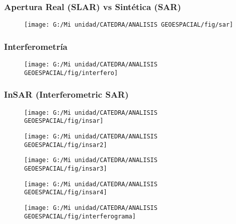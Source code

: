 \documentclass[14pt]{beamer}
\begin{document}
\begin{frame}
\frametitle{Apertura Real (SLAR) vs Sintética (SAR)
}
 \begin{figure}
    \centering
    \texttt{[image: G:/Mi unidad/CATEDRA/ANALISIS GEOESPACIAL/fig/sar]}
  \end{figure}
\end{frame}
\begin{frame}
\frametitle{Interferometría}
 \begin{figure}
    \centering
    \texttt{[image: G:/Mi unidad/CATEDRA/ANALISIS GEOESPACIAL/fig/interfero]}
  \end{figure}
\end{frame}
\begin{frame}
\frametitle{InSAR (Interferometric SAR)
}
 \begin{figure}
    \centering
    \texttt{[image: G:/Mi unidad/CATEDRA/ANALISIS GEOESPACIAL/fig/insar]}
  \end{figure}
\end{frame}
\begin{frame}
 \begin{figure}
    \centering
    \texttt{[image: G:/Mi unidad/CATEDRA/ANALISIS GEOESPACIAL/fig/insar2]}
  \end{figure}
\end{frame}
\begin{frame}
 \begin{figure}
    \centering
    \texttt{[image: G:/Mi unidad/CATEDRA/ANALISIS GEOESPACIAL/fig/insar3]}
  \end{figure}
\end{frame}
\begin{frame}
 \begin{figure}
    \centering
    \texttt{[image: G:/Mi unidad/CATEDRA/ANALISIS GEOESPACIAL/fig/insar4]}
  \end{figure}
\end{frame}
\begin{frame}
 \begin{figure}
    \centering
    \texttt{[image: G:/Mi unidad/CATEDRA/ANALISIS GEOESPACIAL/fig/interferograma]}
  \end{figure}
\end{frame}
\end{document}
